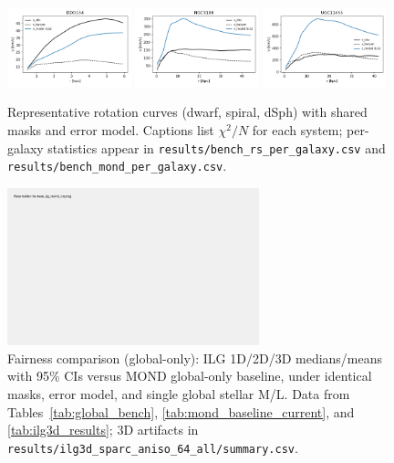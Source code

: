 \documentclass[fleqn,usenatbib]{mnras}
\begin{document}
\begin{figure}[h]
\centering
\includegraphics[width=0.32\textwidth]{results/examples_ddo154.png}
\includegraphics[width=0.32\textwidth]{results/examples_ngc3198.png}
\includegraphics[width=0.32\textwidth]{results/examples_fornax.png}
\caption{Representative rotation curves (dwarf, spiral, dSph) with shared masks and error model. Captions list $\chi^2/N$ for each system; per-galaxy statistics appear in \texttt{results/bench\_rs\_per\_galaxy.csv} and \texttt{results/bench\_mond\_per\_galaxy.csv}.}
\label{fig:examples}
\end{figure}

\begin{figure}[h]
\centering
\includegraphics[width=0.65\textwidth]{results/fairness_ilg_mond_cis.png}
\caption{Fairness comparison (global-only): ILG 1D/2D/3D medians/means with 95\% CIs versus MOND global-only baseline, under identical masks, error model, and single global stellar M/L. Data from Tables~\ref{tab:global_bench}, \ref{tab:mond_baseline_current}, and \ref{tab:ilg3d_results}; 3D artifacts in \texttt{results/ilg3d\_sparc\_aniso\_64\_all/summary.csv}.}
\label{fig:fairness_ilg_mond}
\end{figure}
\end{document}
